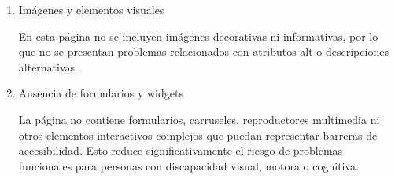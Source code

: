 \documentclass[a4paper]{article}
\begin{document}
\begin{enumerate}
    \item Imágenes y elementos visuales

    En esta página no se incluyen imágenes decorativas ni informativas, por lo que no se presentan problemas relacionados con atributos alt o descripciones alternativas.

    \item Ausencia de formularios y widgets

    La página no contiene formularios, carruseles, reproductores multimedia ni otros elementos interactivos complejos que puedan representar barreras de accesibilidad. Esto reduce significativamente el riesgo de problemas funcionales para personas con discapacidad visual, motora o cognitiva.
\end{enumerate}
\end{document}
